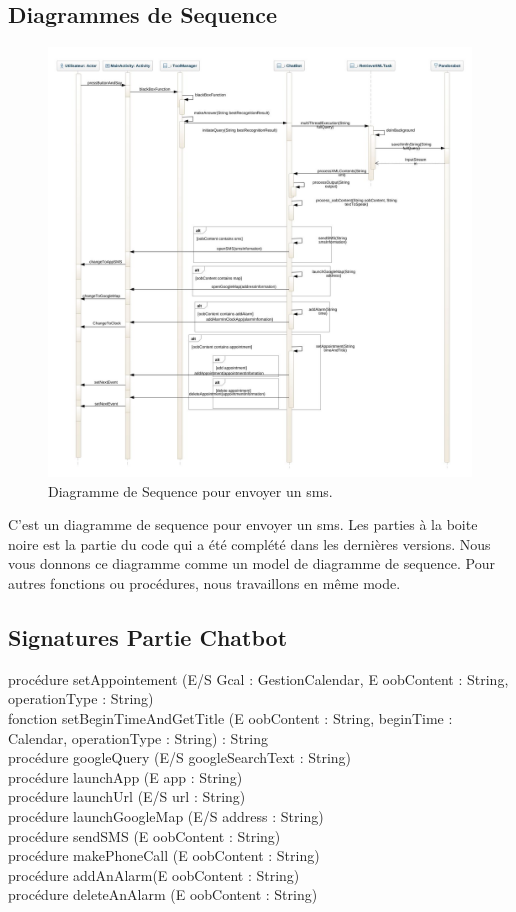 \subsection{Diagrammes de Sequence}
\begin{figure}[h]
\centering
\includegraphics[scale=0.4]{./diagrammes/SequenceDiagram.jpeg}
\caption{Diagramme de Sequence pour envoyer un sms.\label{fig3}}
\end{figure}
\indent C'est un diagramme de sequence pour envoyer un sms. Les parties à la boite noire est la partie du code qui a été complété dans les dernières versions. Nous vous donnons ce diagramme comme un model de diagramme de sequence. Pour autres fonctions ou procédures, nous travaillons en même mode.
\newpage


\subsection{Signatures Partie Chatbot}
procédure setAppointement (E/S Gcal : GestionCalendar, E oobContent : String, operationType : String)\\
\indent fonction setBeginTimeAndGetTitle (E oobContent : String, beginTime : Calendar, operationType : String) : String\\
\indent procédure googleQuery (E/S googleSearchText : String)\\
\indent procédure launchApp (E app : String)\\
\indent procédure launchUrl (E/S url : String)\\
\indent procédure launchGoogleMap (E/S address : String)\\
\indent procédure sendSMS (E oobContent : String)\\
\indent procédure makePhoneCall (E oobContent : String)\\
\indent procédure addAnAlarm(E oobContent : String)\\
\indent procédure deleteAnAlarm (E oobContent : String)\\

